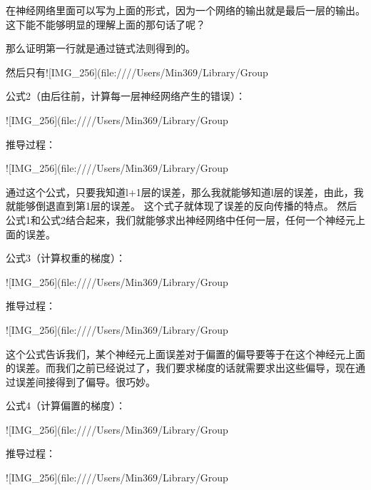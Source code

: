 在神经网络里面可以写为上面的形式，因为一个网络的输出就是最后一层的输出。这下能不能够明显的理解上面的那句话了呢？

那么证明第一行就是通过链式法则得到的。

然后只有![IMG_256](file:////Users/Min369/Library/Group%





公式2（由后往前，计算每一层神经网络产生的错误）：

​![IMG_256](file:////Users/Min369/Library/Group%

推导过程：

​![IMG_256](file:////Users/Min369/Library/Group%



通过这个公式，只要我知道l+1层的误差，那么我就能够知道l层的误差，由此，我就能够倒退直到第1层的误差。
这个式子就体现了误差的反向传播的特点。
然后公式1和公式2结合起来，我们就能够求出神经网络中任何一层，任何一个神经元上面的误差。

公式3（计算权重的梯度）：

​![IMG_256](file:////Users/Min369/Library/Group%

推导过程：

​![IMG_256](file:////Users/Min369/Library/Group%

这个公式告诉我们，某个神经元上面误差对于偏置的偏导要等于在这个神经元上面的误差。而我们之前已经说过了，我们要求梯度的话就需要求出这些偏导，现在通过误差间接得到了偏导。很巧妙。

公式4（计算偏置的梯度）：

​![IMG_256](file:////Users/Min369/Library/Group%

推导过程：

​![IMG_256](file:////Users/Min369/Library/Group%

